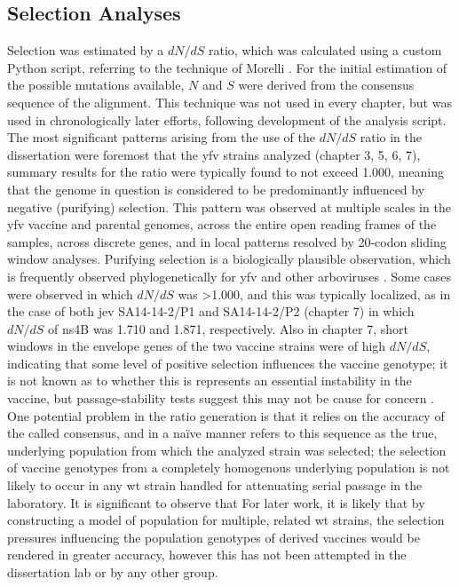 \subsection{Selection Analyses}
Selection was estimated by a $dN/dS$ ratio, which was calculated using a custom Python script, referring to the technique of Morelli \parencite{Morelli:2013jl}. For the initial estimation of the possible mutations available, $N$ and $S$ were derived from the consensus sequence of the alignment. This technique was not used in every chapter, but was used in chronologically later efforts, following development of the analysis script. The most significant patterns arising from the use of the $dN/dS$ ratio in the dissertation were foremost that the \gls{yfv} strains analyzed (chapter 3, 5, 6, 7), summary results for the ratio were typically found to not exceed 1.000, meaning that the genome in question is considered to be predominantly influenced by negative (purifying) selection. This pattern was observed at multiple scales in the \gls{yfv} vaccine and parental genomes, across the entire open reading frames of the samples, across discrete genes, and in local patterns resolved by 20-codon sliding window analyses. Purifying selection is a biologically plausible observation, which is frequently observed phylogenetically for \gls{yfv} and other arboviruses \parencite{Schuh:2011ck,Holmes:2003fq}. Some cases were observed in which $dN/dS$ was >1.000, and this was typically localized, as in the case of both \gls{jev} SA14-14-2/P1 and SA14-14-2/P2 (chapter 7) in which $dN/dS$ of \gls{ns}4B was 1.710 and 1.871, respectively. Also in chapter 7, short windows in the envelope genes of the two vaccine strains were of high $dN/dS$, indicating that some level of positive selection influences the vaccine genotype; it is not known as to whether this is represents an essential instability in the vaccine, but passage-stability tests suggest this may not be cause for concern \parencite{Yang:2014io}. One potential problem in the ratio generation is that it relies on the accuracy of the called consensus, and in a naïve manner refers to this sequence as the true, underlying population from which the analyzed strain was selected; the selection of vaccine genotypes from a completely homogenous underlying population is not likely to occur in any \gls{wt} strain handled for attenuating serial passage in the laboratory. It is significant to observe that For later work, it is likely that by constructing a model of population for multiple, related \gls{wt} strains, the selection pressures influencing the population genotypes of derived vaccines would be rendered in greater accuracy, however this has not been attempted in the dissertation lab or by any other group.
